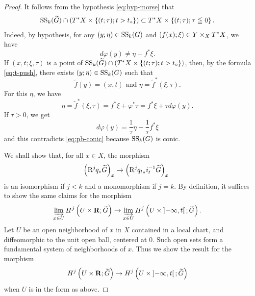 \begin{proof}
  It follows from the hypothesis \eqref{eq:hyp-morse} that
  \begin{equation}\label{eq:tilde-estimate}
    \muS[k](\widetilde{G})\cap\left(
      \cotb[X]\times\left\{(t;\tau);t>t_{\circ}\right\}
    \right)
    \subset
    \cotb[X]\times\left\{(t;\tau);\tau\leqq0\right\}.
  \end{equation}
  Indeed, by hypothesis, 
  for any \((y;\eta)\in\muS[k](G)\) 
  and \((f(x);\xi)\in Y\tpb[X]\cotb[X]\), 
  we have 
  \begin{equation}\label{eq:pb-conic}
    d\varphi(y)\neq \eta + f^{\ast}\xi.
  \end{equation}
  If \((x,t;\xi,\tau)\) is a point of \(
    \muS[k](\widetilde{G})\cap\left(
      \cotb[X]\times\left\{(t;\tau);t>t_{\circ}\right\}
  \right)\), 
  then, by the formula \eqref{eq:t-push}, 
  there exists \((y;\eta)\in\muS[k](G)\) such that \[
    \tilde{f}(y)=(x,t) 
    \text{ and } 
    \eta=\tilde{f}^{\ast}(\xi,\tau).
  \] For this \(\eta\), we have \[
    \eta
    =\tilde{f}^{\ast}(\xi,\tau)
    =f^{\ast}\xi +\varphi^{\ast}\tau
    =f^{\ast}\xi +\tau d\varphi(y).
  \]
  If \(\tau>0\), we get \[
    d\varphi(y)=\frac{1}{\tau}\eta-\frac{1}{\tau}f^{\ast}\xi
  \] and this contradicts \eqref{eq:pb-conic} 
  because \(\muS[k](G)\) is conic. 

  We shall show that, for all \(x\in X\), the morphism
  \[
    \left(\Rder[j]{q_{\ast}}\widetilde{G}\right)_{x}\to
    \left(\Rder[j]{{q_{t}}_{\ast}}i_{t}^{-1}\widetilde{G}\right)_{x}\
  \]
  is an isomorphism if \(j<k\) 
  and a monomorphism if \(j=k\). 
  By definition, it suffices to show 
  the same claims for the morphism
  \[
    \indlim[x\in U]H^{j}\left(U\times \rr;\widetilde{G}\right)
    \to
    \indlim[x\in U]H^{j}\left(U\times \lopen-\infty,t\ropen ;\widetilde{G}\right).
  \]
  Let \(U\) be an open neighborhood of \(x\) in \(X\) contained 
  in a local chart, and diffeomorphic to the unit open ball, centered at \(0\). 
  Such open sets form a fundamental system of neighborhoods of \(x\). 
  Thus we show the result for the morphism
  \[
    H^{j}\left(U\times \rr;\widetilde{G}\right)
    \to
    H^{j}\left(U\times \lopen-\infty,t\ropen ;\widetilde{G}\right)
  \]
  when \(U\) is in the form as above.


\end{proof}
